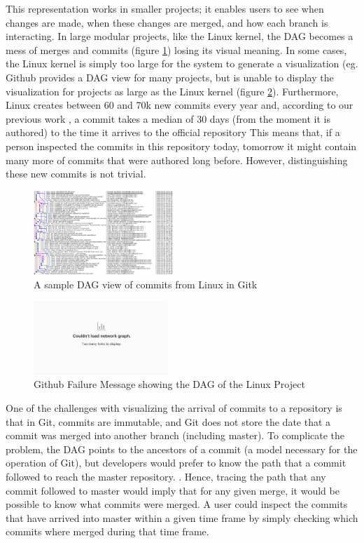 \documentclass[conference, draftclsnofoot, draft]{IEEEtran}
\begin{document}
This representation works in smaller projects; it enables users to see
when changes are made, when these changes are merged, and how each branch is
interacting.  
In large modular projects, like the Linux kernel, the DAG becomes a
mess of merges and commits (figure \ref{fig:gitk}) losing its visual meaning.  In
some cases, the Linux kernel is simply too large for the system to generate a
visualization (eg. Github provides a DAG view for many projects, but is unable to
display the visualization for projects as large as the Linux kernel (figure
\ref{fig:gitfail}).
Furthermore, Linux creates between 60 and 70k new commits every year and, according to our previous work \cite{German2015}, 
a commit takes a median of 30 days (from the moment it is authored) to the time it arrives to the official repository
This means that, if a person inspected the commits in this repository today, tomorrow it might contain  many more
of commits that were authored long before. However, distinguishing these new commits is not trivial. 

\begin{figure}
        \centering
        \includegraphics[width=0.47\textwidth]{figures/gitk.png}
        \caption{A sample DAG view of commits from Linux in Gitk}
        \label{fig:gitk}
\end{figure}

\begin{figure}
        \centering
        \includegraphics[width=0.45\textwidth]{figures/github_viewer.png}
        \caption{Github Failure Message showing the DAG of the Linux Project}
        \label{fig:gitfail}
\end{figure}


One of the challenges with visualizing the arrival of commits to a repository is that
in Git, commits are immutable, and Git does not store the date that a commit was merged into another branch (including master).
To complicate the problem, the DAG points to the ancestors of a commit (a model necessary for the operation of Git), but developers 
would prefer to know the path that a commit followed to reach the master repository. .
Hence, tracing the path that any commit followed to master would imply that for any given merge, it would be possible to know what commits were merged. A user could
inspect the commits that have arrived into master within a given time frame by simply checking which commits where merged during that time frame.
\end{document}
